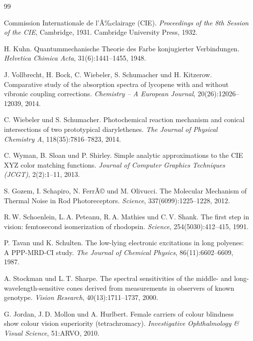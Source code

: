 ﻿\documentclass[a4paper,12pt]{article}
\theoremstyle{definition}
\begin{document}
\begin{thebibliography}{99}

Commission Internationale de l'Ã‰clairage (CIE).
\textit{Proceedings of the 8th Session of the CIE}, Cambridge, 1931.
Cambridge University Press, 1932.

H. Kuhn.
Quantummechanische Theorie des Farbe konjugierter Verbindungen.
\textit{Helvetica Chimica Acta}, 31(6):1441--1455, 1948.

J. Vollbrecht, H. Bock, C. Wiebeler, S. Schumacher und H. Kitzerow.
Comparative study of the absorption spectra of lycopene with and without vibronic coupling corrections.
\textit{Chemistry -- A European Journal}, 20(26):12026--12039, 2014.

C. Wiebeler und S. Schumacher.
Photochemical reaction mechanism and conical intersections of two prototypical diarylethenes.
\textit{The Journal of Physical Chemistry A}, 118(35):7816--7823, 2014.

C. Wyman, B. Sloan und P. Shirley.
Simple analytic approximations to the CIE XYZ color matching functions.
\textit{Journal of Computer Graphics Techniques (JCGT)}, 2(2):1--11, 2013.

S. Gozem, I. Schapiro, N. FerrÃ© und M. Olivucci.
The Molecular Mechanism of Thermal Noise in Rod Photoreceptors.
\textit{Science}, 337(6099):1225--1228, 2012.

R.\,W. Schoenlein, L.\,A. Peteanu, R.\,A. Mathies und C.\,V. Shank.
The first step in vision: femtosecond isomerization of rhodopsin.
\textit{Science}, 254(5030):412--415, 1991.

P. Tavan und K. Schulten.
The low-lying electronic excitations in long polyenes: A PPP-MRD-CI study.
\textit{The Journal of Chemical Physics}, 86(11):6602--6609, 1987.

A. Stockman und L.\,T. Sharpe.
The spectral sensitivities of the middle- and long-wavelength-sensitive cones derived from measurements in observers of known genotype.
\textit{Vision Research}, 40(13):1711--1737, 2000.

G. Jordan, J.\,D. Mollon und A. Hurlbert.
Female carriers of colour blindness show colour vision superiority (tetrachromacy).
\textit{Investigative Ophthalmology \& Visual Science}, 51:ARVO, 2010.


\end{thebibliography}
\end{document}
